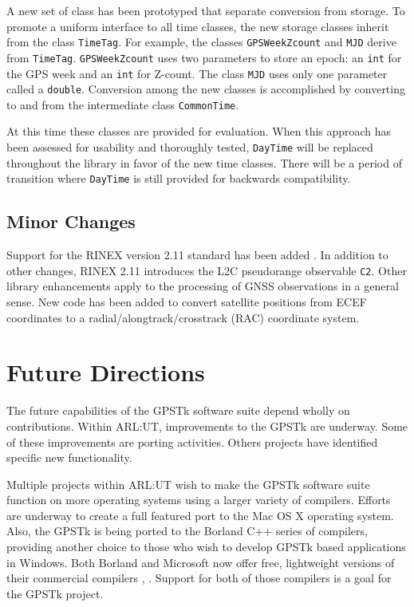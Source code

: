 \documentclass{ion-gps}
\newcommand{\gpstkclass}[1]{\texttt{#1}}
\newcommand{\rinexobservable}[1]{\texttt{#1}}
\begin{document}
A new set of class has been prototyped that separate conversion from
storage. To promote a uniform interface to all time classes, the
new storage classes inherit from the class \gpstkclass{TimeTag}. For
example, the classes \gpstkclass{GPSWeekZcount} and \gpstkclass{MJD}
derive from \gpstkclass{TimeTag}. \gpstkclass{GPSWeekZcount}
uses two parameters to store an epoch: an \gpstkclass{int} for the GPS
week and an \gpstkclass{int} for Z-count. The class \gpstkclass{MJD}
uses only one parameter called a \gpstkclass{double}. Conversion among the new classes
is accomplished by converting to and from the intermediate class
\gpstkclass{CommonTime}.

At this time these classes are provided for evaluation. When this
approach has been assessed for usability and thoroughly tested, 
\gpstkclass{DayTime} will be replaced throughout the library in favor
of the new time classes. There will be a period of transition where
\gpstkclass{DayTime} is still provided for backwards compatibility.

\subsection*{Minor Changes}
Support for the RINEX version 2.11 standard has been added
\cite{rinex300format}. In addition to other changes, RINEX 2.11 introduces 
the L2C pseudorange observable \rinexobservable{C2}.  Other library 
enhancements apply to the processing of GNSS
observations in a general sense. New code has been added to convert
satellite positions from ECEF coordinates to a radial/alongtrack/crosstrack 
(RAC) coordinate system.


\section*{Future Directions}

The future capabilities of the GPSTk software suite depend wholly on
contributions. Within ARL:UT, improvements to the GPSTk are
underway. Some of these improvements are porting activities. Others
projects have identified specific new functionality.

Multiple projects within ARL:UT wish to make the \mbox{GPSTk} software
suite function on more operating systems using a larger variety of
compilers. Efforts are underway to create a full featured port to the
Mac OS X operating system. Also, the GPSTk is being ported to the
Borland C++ series of compilers, providing another choice to those who
wish to develop GPSTk based applications in Windows. Both Borland and Microsoft now offer free, lightweight versions of their commercial compilers \cite{borlandfreecompiler},
\cite{microsoftfreecompiler}. Support for both of those
compilers is a goal for the GPSTk project.
\end{document}
